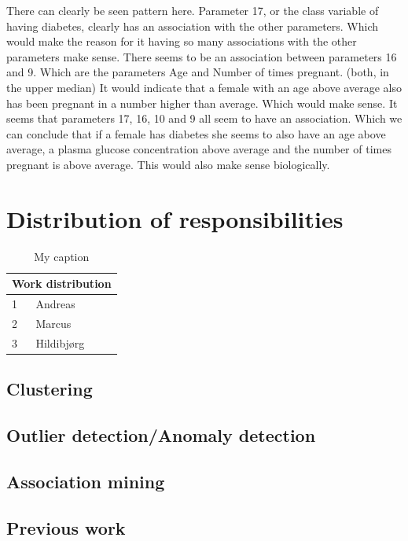 There can clearly be seen pattern here. Parameter 17, or the class variable of having diabetes, clearly has an association with the other parameters.
Which would make the reason for it having so many associations with the other parameters make sense.
There seems to be an association between parameters 16 and 9. Which are the parameters Age and Number of times pregnant. (both, in the upper median)
It would indicate that a female with an age above average also has been pregnant in a number higher than average. Which would make sense.
It seems that parameters 17, 16, 10 and 9 all seem to have an association.
Which we can conclude that if a female has diabetes she seems to also have an age above average, a plasma glucose concentration above average and the number of times pregnant is above average.
This would also make sense biologically.



\appendix
\section{Distribution of responsibilities}
\begin{table}[]
\centering
\caption{My caption}
\label{my-label}
\begin{tabular}{ll}
\hline
\multicolumn{2}{|l|}{Work distribution} \\ \hline
1              & Andreas                \\
2              & Marcus                 \\
3              & Hildibjørg
\end{tabular}
\end{table}
\subsection{Clustering}

\subsection{Outlier detection/Anomaly detection}

\subsection{Association mining}

\subsection{Previous work}
